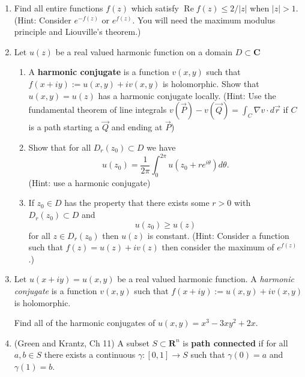 \documentclass[a4paper,10pt]{article}
\title{}
\author{Dupuy --- Complex Analysis --- Spring 2017 --- Homework 03}
\date{}
\newcommand{\RR}{\mathbf{R}}
\newcommand{\CC}{\mathbf{C}}
\renewcommand{\Re}{\operatorname{Re}}
\begin{document}
\maketitle

\begin{enumerate}
\subsection*{Master's level}

\item Find all entire functions $f(z)$ which satisfy $\Re f(z) \leq 2/\vert z \vert$ when $\vert z \vert > 1$. (Hint: Consider $e^{-f(z)}$ or $e^{f(z)}$. You will need the maximum modulus principle and Liouville's theorem.)

\item Let $u(z)$ be a real valued harmonic function on a domain $D \subset \CC$ 
\begin{enumerate}
\item A \textbf{harmonic conjugate} is a function $v(x,y)$ such that $f(x+iy):= u(x,y) + i v(x,y)$ is holomorphic. Show that $u(x,y) = u(z)$ has a harmonic conjugate locally. (Hint: Use the fundamental theorem of line integrals $v(\vec{P}) -v(\vec{Q})  = \int_{C} \nabla v \cdot d\vec{r}$ if $C$ is a path starting a $\vec{Q}$ and ending at $\vec{P}$)
\item Show that for all $D_r(z_0) \subset D$ we have 
 $$ u(z_0) = \frac{1}{2\pi} \int_0^{2\pi} u(z_0+ r e^{i\theta}) d\theta. $$ (Hint: use a harmonic conjugate)
\item If $z_0 \in D$ has the property that there exists some $r>0$ with $D_r(z_0) \subset D$ and 
 $$ u(z_0) \geq u(z) $$
for all $z \in D_r(z_0)$ then $u(z)$ is constant. 
(Hint: Consider a function such that $f(z) = u(z)+iv(z)$ then consider the maximum of $e^{f(z)}$.)

\end{enumerate}



\item Let $u(x+iy)=u(x,y)$ be a real valued harmonic function. 
A \emph{harmonic conjugate} is a function $v(x,y)$ such that $f(x+iy):= u(x,y) + i v(x,y)$ is holomorphic. 

Find all of the harmonic conjugates of $u(x,y) = x^3 - 3xy^2 + 2x$. 


\item (Green and Krantz, Ch 11) A subset $S \subset \RR^n$ is \textbf{path connected} if for all $a,b \in S$ there exists a continuous $\gamma: [0,1] \to S$ such that $\gamma(0) = a$ and $\gamma(1) = b$. 


\end{enumerate}
\end{document}
